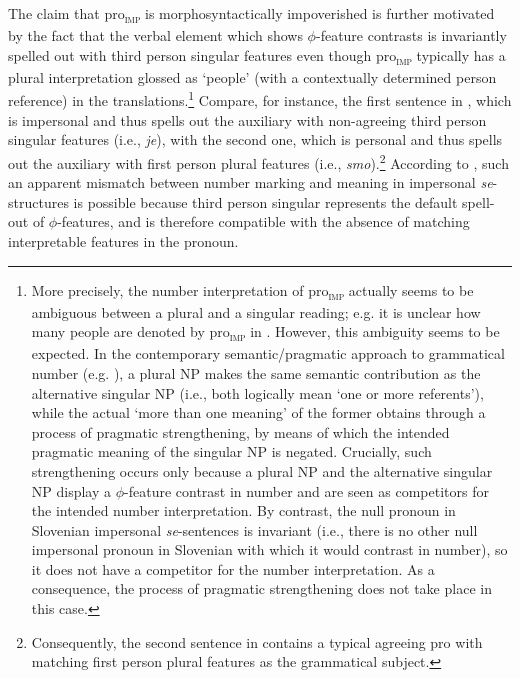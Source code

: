 \documentclass[output=paper,
modfonts,nonflat,
newtxmath
]{langsci/langscibook}
\begin{document}
 \noindent The claim that pro\textsubscript{\textsc{imp}} is morphosyntactically impoverished is further motivated by the fact that the verbal element which shows $\phi$-feature contrasts is invariantly spelled out with third person singular features even though pro\textsubscript{\textsc{imp}} typically has a plural interpretation glossed as `people' (with a contextually determined person reference) in the translations.\footnote{More precisely, the number interpretation of pro\textsubscript{\textsc{imp}} actually seems to be ambiguous between a plural and a singular reading; e.g. it is unclear how many people are denoted by pro\textsubscript{\textsc{imp}} in . However, this ambiguity  seems to be expected. In  the contemporary semantic/pragmatic approach to grammatical number (e.g. \citealt{sauerland2005}), a plural NP makes the same semantic contribution as the alternative singular NP (i.e., both logically mean `one or more referents'), while the actual `more than one meaning' of the former obtains through a process of pragmatic strengthening, by means of which the  intended pragmatic meaning of the singular NP is negated. Crucially, such strengthening occurs only because a plural NP and the alternative singular NP display a $\phi$-feature contrast in number and are seen as competitors for the intended number interpretation.  By contrast, the null pronoun in Slovenian impersonal \textit{se}-sentences is invariant (i.e., there is no other null impersonal pronoun in Slovenian with which it would contrast in number), so it does not have a competitor for the number interpretation. As a consequence, the process of pragmatic strengthening does not take place in this case.} Compare, for instance,  the first sentence in , which is impersonal and thus spells out the auxiliary with non-agreeing third person singular features (i.e., \textit{je}), with the second one, which is personal and thus spells out the auxiliary with first person plural features (i.e., \textit{smo}).\footnote{Consequently, the second sentence in  contains a typical agreeing pro with matching first person plural features as the grammatical subject.} According to \citet{ackema2013}, such an apparent mismatch between number marking and meaning in impersonal \textit{se}-structures is possible because third person singular represents the default spell-out of $\phi$-features,  and is therefore compatible with the absence of matching interpretable features in the pronoun.  \par
 
\end{document}
